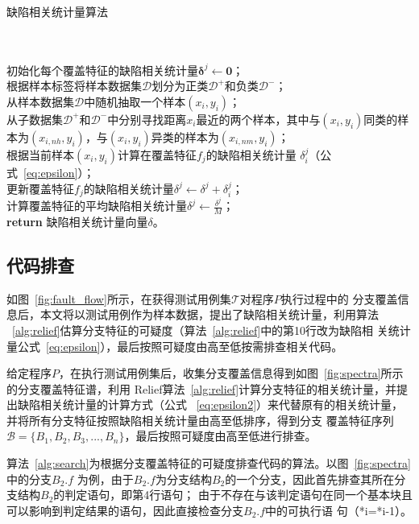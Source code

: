 \begin{algorithm}[H]
\caption{缺陷相关统计量算法}\label{alg:relief}
\\
 \\
初始化每个覆盖特征的缺陷相关统计量$\bm \delta^j \leftarrow \bm 0$；\\ 
根据样本标签将样本数据集$\mathcal D$划分为正类$\mathcal D^+$和负类$\mathcal D^-$；\\
 {
     从样本数据集$\mathcal D$中随机抽取一个样本$(x_i,y_i)$；\\
     从子数据集$\mathcal D^+$和$\mathcal D^-$中分别寻找距离$x_i$最近的两个样本，其中与$(x_i,y_i)$同类的样本为$(x_{i,nh},y_i)$，与$(x_i,y_i)$异类的样本为$(x_{i,nm},y_i)$；\\
      {根据当前样本$(x_i,y_i)$计算在覆盖特征$f_j$的缺陷相关统计量
            $\delta^j_i$（公式~\eqref{eq:epsilon}）；\\
            更新覆盖特征$f_j$的缺陷相关统计量$\delta^j \leftarrow \delta^j + \delta^j_i$；\\
     }
}
 {
      计算覆盖特征的平均缺陷相关统计量$\delta^j \leftarrow \frac{\delta^j}{M}$；\\
}
\textbf{return} 缺陷相关统计量向量$\delta$。\\
\end{algorithm}

\subsection{代码排查}\label{code_search}
如图~\ref{fig:fault_flow}所示，在获得测试用例集$\mathcal T$对程序$P$执行过程中的
分支覆盖信息后，本文将以测试用例作为样本数据，提出了缺陷相关统计量，利用算法
~\ref{alg:relief}估算分支特征的可疑度（算法~\ref{alg:relief}中的第10行改为缺陷相
关统计量公式~\eqref{eq:epsilon}），最后按照可疑度由高至低按需排查相关代码。

给定程序$P$，在执行测试用例集后，收集分支覆盖信息得到如图~\ref{fig:spectra}所示的分支覆盖特征谱，利用
Relief算法~\ref{alg:relief}计算分支特征的相关统计量，并提出缺陷相关统计量的计算方式（公式
~\eqref{eq:epsilon2}）来代替原有的相关统计量，并将所有分支特征按照缺陷相关统计量由高至低排序，得到分支
覆盖特征序列$\mathcal B=\{B_1,B_2,B_3,...,B_n\}$，最后按照可疑度由高至低进行排查。

算法~\ref{alg:search}为根据分支覆盖特征的可疑度排查代码的算法。以图~\ref{fig:spectra}中的分支$B_2.f$
为例，由于$B_2.f$为分支结构$B_2$的一个分支，因此首先排查其所在分支结构$B_2$的判定语句，即第4行语句；
由于不存在与该判定语句在同一个基本块且可以影响到判定结果的语句，因此直接检查分支$B_2.f$中的可执行语
句（*i=*i-1）。

